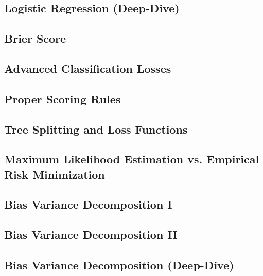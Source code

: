 \subsection{Logistic Regression (Deep-Dive)}


\subsection{Brier Score}


\subsection{Advanced Classification Losses}


\subsection{Proper Scoring Rules}


\subsection{Tree Splitting and Loss Functions}


\subsection{Maximum Likelihood Estimation vs. Empirical Risk Minimization}


\subsection{Bias Variance Decomposition I}


\subsection{Bias Variance Decomposition II}


\subsection{Bias Variance Decomposition (Deep-Dive)}



